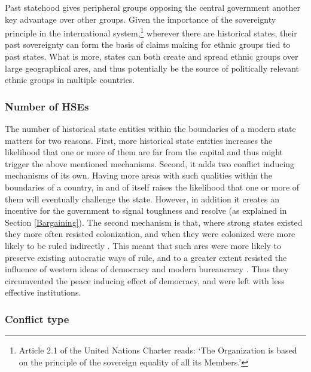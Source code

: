 Past statehood gives peripheral groups opposing the central government another
key advantage over other groups. Given the importance of the sovereignty
principle in the international system,\footnote{Article 2.1 of the United
	Nations Charter reads: `The Organization is based on the principle of
the sovereign equality of all its Members.'} wherever there are historical
states, their past sovereignty can form the basis of claims making for ethnic
groups tied to past states. What is more, states can both create and spread
ethnic groups over large geographical ares, and thus potentially be the source
of politically relevant ethnic groups in multiple countries. 

\subsubsection{Number of HSEs} \label{Number of HSEs}

The number of historical state entities within the boundaries of a modern state
matters for two reasons. First, more historical state entities increases the
likelihood that one or more of them are far from the capital and thus might
trigger the above mentioned mechanisms. Second, it adds two conflict inducing
mechanisms of its own. Having more areas with such qualities within the
boundaries of a country, in and of itself raises the likelihood that one or more
of them will eventually challenge the state. However, in addition it creates an
incentive for the government to signal toughness and resolve (as explained in
Section \ref{Bargaining}). The second mechanism is that, where strong states
existed they more often resisted colonization, and when they were colonized were
more likely to be ruled indirectly \citep{Englebert2000, Gerring2011,
Hariri2012}. This meant that such ares were more likely to preserve existing
autocratic ways of rule, and to a greater extent resisted the influence of
western ideas of democracy and modern bureaucracy \citep{Foa_2017, Hariri2012}.
Thus they circumvented the peace inducing effect of democracy, and were left
with less effective institutions.

\subsubsection{Conflict type} \label{Conflict type}

